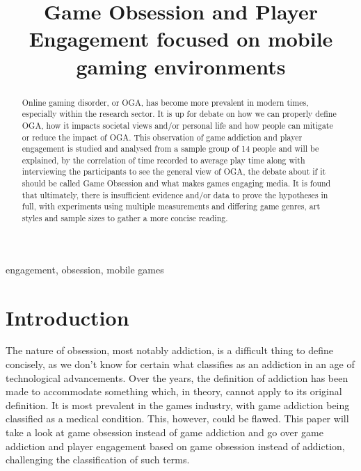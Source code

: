 \documentclass[conference]{IEEEtran}
\begin{document}
\title{Game Obsession and Player Engagement focused on mobile gaming environments \\
}

\author{
}

\maketitle



\begin{abstract}
Online gaming disorder, or OGA, has become more prevalent in modern times, especially within the research sector. It is up for debate on how we can properly define OGA, how it impacts societal views and/or personal life and how people can mitigate or reduce the impact of OGA. This observation of game addiction and player engagement is studied and analysed from a sample group of 14 people and will be explained, by the correlation of time recorded to average play time along with interviewing the participants to see the general view of OGA, the debate about if it should be called Game Obsession and what makes games engaging media. It is found that ultimately, there is insufficient evidence and/or data to prove the hypotheses in full, with experiments using multiple measurements and differing game genres, art styles and sample sizes to gather a more concise reading. 
\end{abstract}
\begin{IEEEkeywords}
engagement, obsession, mobile games
\end{IEEEkeywords}

\section{Introduction}
The nature of obsession, most notably addiction, is a difficult thing to define concisely, as we don't know for certain what classifies as an addiction in an age of technological advancements. Over the years, the definition of addiction has been made to accommodate something which, in theory, cannot apply to its original definition. It is most prevalent in the games industry, with game addiction being classified as a medical condition. This, however, could be flawed. This paper will take a look at game obsession instead of game addiction and go over game addiction and player engagement based on game obsession instead of addiction, challenging the classification of such terms.\\
\end{document}
